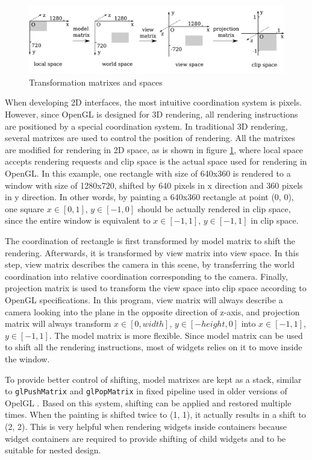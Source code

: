 \documentclass[msc,deptreport, cs]{infthesis}
\begin{document}
\begin{figure}[!htb]
  \centering
  \includegraphics[width=\columnwidth]{matrix.pdf}
  \caption{Transformation matrixes and spaces}
  \label{fig:matrix}
\end{figure}

When developing 2D interfaces, the most intuitive coordination system is pixels. However, since OpenGL is designed for 3D rendering, all rendering instructions are positioned by a special coordination system. In traditional 3D rendering, several matrixes are used to control the position of rendering. All the matrixes are modified for rendering in 2D space, as is shown in figure \ref{fig:matrix}, where local space accepts rendering requests and clip space is the actual space used for rendering in OpenGL. In this example, one rectangle with size of 640x360 is rendered to a window with size of 1280x720, shifted by 640 pixels in x direction and 360 pixels in y direction. In other words, by painting a 640x360 rectangle at point (0, 0), one square $x\in[0, 1]$, $y\in[-1, 0]$ should be actually rendered in clip space, since the entire window is equivalent to $x\in[-1, 1]$, $y\in[-1, 1]$ in clip space.

The coordination of rectangle is first transformed by model matrix to shift the rendering. Afterwards, it is transformed by view matrix into view space. In this step, view matrix describes the camera in this scene, by transferring the world coordination into relative coordination corresponding to the camera. Finally, projection matrix is used to transform the view space into clip space according to OpenGL specifications. In this program, view matrix will always describe a camera looking into the plane in the opposite direction of z-axis, and projection matrix will always transform $x\in[0, width]$, $y\in[-height, 0]$ into $x\in[-1, 1]$, $y\in[-1, 1]$. The model matrix is more flexible. Since model matrix can be used to shift all the rendering instructions, most of widgets relies on it to move inside the window.

To provide better control of shifting, model matrixes are kept as a stack, similar to \verb+glPushMatrix+ and \verb+glPopMatrix+ in fixed pipeline used in older versions of OpelGL \cite{opengl}. Based on this system, shifting can be applied and restored multiple times. When the painting is shifted twice to (1, 1), it actually results in a shift to (2, 2). This is very helpful when rendering widgets inside containers because widget containers are required to provide shifting of child widgets and to be suitable for nested design.
\end{document}
